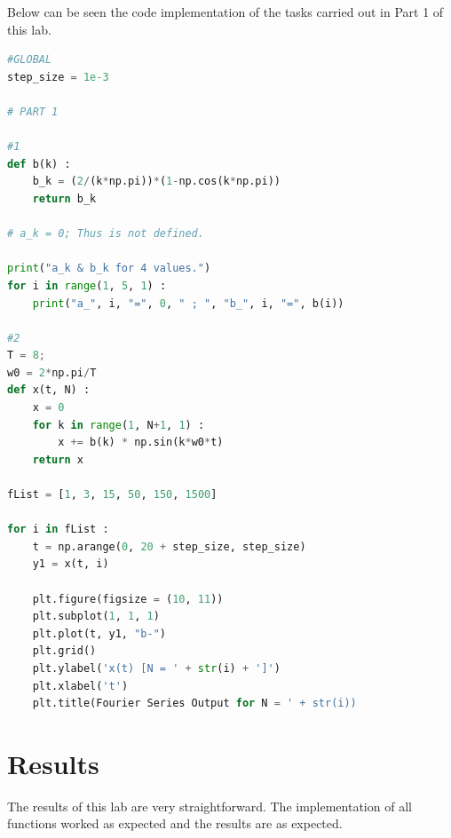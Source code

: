 \documentclass[12pt]{report}
\begin{document}
Below can be seen the code implementation of the tasks carried out in Part 1 of this lab.

\begin{lstlisting}[language=Python, basicstyle=\footnotesize]
#GLOBAL
step_size = 1e-3

# PART 1

#1
def b(k) :
    b_k = (2/(k*np.pi))*(1-np.cos(k*np.pi))
    return b_k

# a_k = 0; Thus is not defined.

print("a_k & b_k for 4 values.")
for i in range(1, 5, 1) :
    print("a_", i, "=", 0, " ; ", "b_", i, "=", b(i))

#2
T = 8;
w0 = 2*np.pi/T
def x(t, N) :
    x = 0
    for k in range(1, N+1, 1) :
        x += b(k) * np.sin(k*w0*t)
    return x

fList = [1, 3, 15, 50, 150, 1500]

for i in fList :
    t = np.arange(0, 20 + step_size, step_size)
    y1 = x(t, i)
    
    plt.figure(figsize = (10, 11))
    plt.subplot(1, 1, 1)
    plt.plot(t, y1, "b-")
    plt.grid()
    plt.ylabel('x(t) [N = ' + str(i) + ']')
    plt.xlabel('t')
    plt.title(Fourier Series Output for N = ' + str(i))
\end{lstlisting}

\section{Results}\label{section: Results}
The results of this lab are very straightforward. The implementation of all functions worked as expected and the results are as expected.
\end{document}
